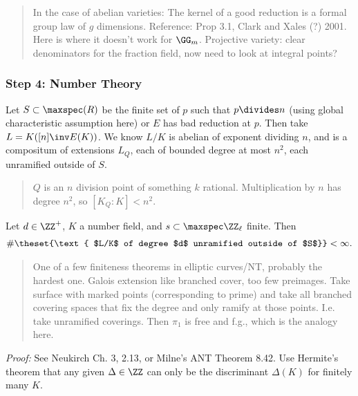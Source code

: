\begin{quote}
In the case of abelian varieties: The kernel of a good reduction is a
formal group law of \(g\) dimensions. Reference: Prop 3.1, Clark and
Xales (?) 2001. Here is where it doesn't work for \(\GG_m\). Projective
variety: clear denominators for the fraction field, now need to look at
integral points?
\end{quote}

\hypertarget{step-4-number-theory}{%
\subsubsection{Step 4: Number Theory}\label{step-4-number-theory}}

Let \(S \subset \maxspec(R)\) be the finite set of \(p\) such that
\(p \divides n\) (using global characteristic assumption here) or \(E\)
has bad reduction at \(p\). Then take \(L = K([n]\inv E(K))\). We know
\(L/K\) is abelian of exponent dividing \(n\), and is a compositum of
extensions \(L_Q\), each of bounded degree at most \(n^2\), each
unramified outside of \(S\).

\begin{quote}
\(Q\) is an \(n\) division point of something \(k\) rational.
Multiplication by \(n\) has degree \(n^2\), so \([K_Q : K] < n^2\).
\end{quote}

\begin{description}
\tightlist
\item[Theorem (Hermike - Minkowski)]
Let \(d \in \ZZ^+\), \(K\) a number field, and
\(s \subset \maxspec \ZZ_\ell\) finite. Then
\begin{align*}\#\theset{\text{ $L/K$ of degree $d$ unramified outside of $S$}} < \infty.\end{align*}
\end{description}

\begin{quote}
One of a few finiteness theorems in elliptic curves/NT, probably the
hardest one. Galois extension like branched cover, too few preimages.
Take surface with marked points (corresponding to prime) and take all
branched covering spaces that fix the degree and only ramify at those
points. I.e. take unramified coverings. Then \(\pi_1\) is free and f.g.,
which is the analogy here.
\end{quote}

\emph{Proof:} See Neukirch Ch. 3, 2.13, or Milne's ANT Theorem 8.42. Use
Hermite's theorem that any given \(\Delta \in \ZZ\) can only be the
discriminant \(\Delta(K)\) for finitely many \(K\).

